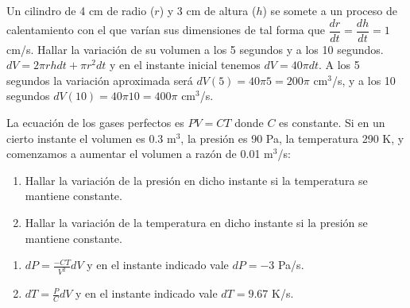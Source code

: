 
{Un cilindro de 4 cm de radio ($r$) y 3 cm de altura ($h$) se somete a un proceso de calentamiento con el que varían sus dimensiones de tal forma que $\dfrac{dr}{dt}=\dfrac{dh}{dt}= 1$ cm/s. Hallar la variación de su volumen a los 5 segundos y a los 10 segundos.
}
{$dV = 2\pi r h dt + \pi r^2 dt$ y en el instante inicial tenemos $dV = 40\pi dt$. A los 5 segundos la variación aproximada será $dV(5) = 40\pi 5 = 200\pi$ cm$^3$/s, y a los 10 segundos $dV(10) = 40\pi 10 = 400\pi$ cm$^3$/s.
}
{
}


{La ecuación de los gases perfectos es $PV=CT$ donde $C$ es constante. Si en un cierto instante el volumen es 0.3 m$^3$, la presión es 90 Pa, la temperatura 290 K, y comenzamos a aumentar el volumen a razón de 0.01 m$^3$/s:
\begin{enumerate}
   \item  Hallar la variación de la presión en dicho instante si
   la temperatura se mantiene constante.

   \item  Hallar la variación de la temperatura en dicho instante si
   la presión se mantiene constante.
\end{enumerate}
}
{\begin{enumerate}
\item $dP = \frac{-CT}{V^2}dV$ y en el instante indicado vale $dP = -3 $ Pa/s.
\item $dT = \frac{P}{C} dV$ y en el instante indicado vale $dT = 9.67$ K/s.  
\end{enumerate}
}
{
}
